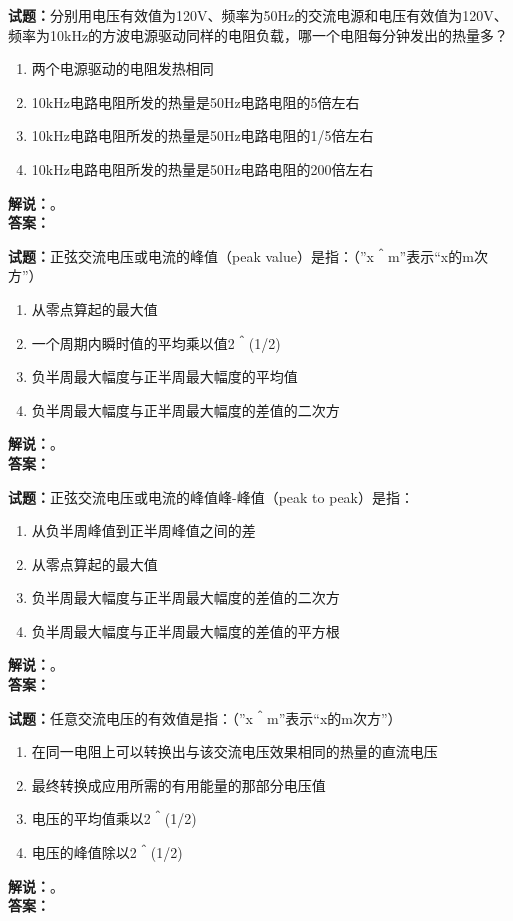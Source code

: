 \documentclass{ctexbook}
\begin{document}
\bigskip

\noindent\textbf{试题：}分别用电压有效值为120V、频率为50Hz的交流电源和电压有效值为120V、频率为10\unit{\kHz}的方波电源驱动同样的电阻负载，哪一个电阻每分钟发出的热量多？
\begin{enumerate}[leftmargin=3em]
  \item 两个电源驱动的电阻发热相同
  \item 10\unit{\kHz}电路电阻所发的热量是50Hz电路电阻的5倍左右
  \item 10\unit{\kHz}电路电阻所发的热量是50Hz电路电阻的1/5倍左右
  \item 10\unit{\kHz}电路电阻所发的热量是50Hz电路电阻的200倍左右
\end{enumerate}
\noindent\textbf{解说：}\textbf{}。\\\noindent\textbf{答案：}

\bigskip

\noindent\textbf{试题：}正弦交流电压或电流的峰值（peak value）是指：（”x＾m”表示“x的m次方”）
\begin{enumerate}[leftmargin=3em]
  \item 从零点算起的最大值
  \item 一个周期内瞬时值的平均乘以值2＾(1/2)
  \item 负半周最大幅度与正半周最大幅度的平均值
  \item 负半周最大幅度与正半周最大幅度的差值的二次方
\end{enumerate}
\noindent\textbf{解说：}\textbf{}。\\\noindent\textbf{答案：}

\bigskip

\noindent\textbf{试题：}正弦交流电压或电流的峰值峰-峰值（peak to peak）是指：
\begin{enumerate}[leftmargin=3em]
  \item 从负半周峰值到正半周峰值之间的差
  \item 从零点算起的最大值
  \item 负半周最大幅度与正半周最大幅度的差值的二次方
  \item 负半周最大幅度与正半周最大幅度的差值的平方根
\end{enumerate}
\noindent\textbf{解说：}\textbf{}。\\\noindent\textbf{答案：}

\bigskip

\noindent\textbf{试题：}任意交流电压的有效值是指：（”x＾m”表示“x的m次方”）
\begin{enumerate}[leftmargin=3em]
  \item 在同一电阻上可以转换出与该交流电压效果相同的热量的直流电压
  \item 最终转换成应用所需的有用能量的那部分电压值
  \item 电压的平均值乘以2＾(1/2)
  \item 电压的峰值除以2＾(1/2)
\end{enumerate}
\noindent\textbf{解说：}\textbf{}。\\\noindent\textbf{答案：}
\end{document}
